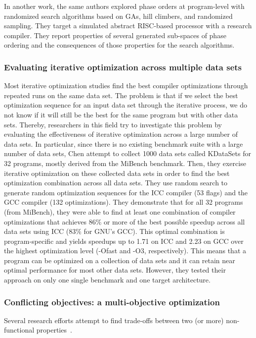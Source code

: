 In another work\cite{cooper2006exploring}, the same authors explored phase orders at program-level with randomized search algorithms based on GAs, hill climbers, and randomized sampling. They target a simulated abstract RISC-based processor with a research compiler. They report properties of several generated sub-spaces of phase ordering and the consequences of those properties for the search algorithms.

\subsubsection{Evaluating iterative optimization across multiple data sets}
Most iterative optimization studies find the best compiler optimizations through repeated runs on the same data set. The problem is that if we select the best optimization sequence for an input data set through the iterative process, we do not know if it will still be the best for the same program but with other data sets. Thereby, researchers in this field try to investigate this problem by evaluating the effectiveness of iterative optimization across a large number of data sets. In particular, since there is no existing benchmark suite with a large number of data sets, Chen \etal\cite{chen2010evaluating} attempt to collect 1000 data sets called KDataSets for 32 programs, mostly derived from the MiBench benchmark. Then, they exercise iterative optimization on these collected data sets in order to find the best optimization combination across all data sets. 
They use random search to generate random optimization sequences for the ICC compiler (53 flags) and the GCC compiler (132 optimizations).
They demonstrate that for all 32 programs (from MiBench), they were able to find at least one combination of compiler optimizations that achieves 86\% or more of the best possible speedup across all data sets using ICC (83\% for GNU’s GCC). This optimal combination is program-specific and yields speedups up to 1.71 on ICC and 2.23 on GCC over the highest optimization level (-Ofast and -O3, respectively). This means that a program can be optimized on a collection of data sets and it can retain near optimal performance for most other data sets. However, they tested their approach on only one single benchmark and one target architecture.

\subsubsection{Conflicting objectives: a multi-objective optimization}
Several research efforts attempt to find trade-offs between two (or more) non-functional properties~\cite{almagor2004finding,hoste2008cole,pan2006fast,pallister2015identifying,chen2012deconstructing,martins2014exploration,lin2008automatic,martinez2014multi}.

